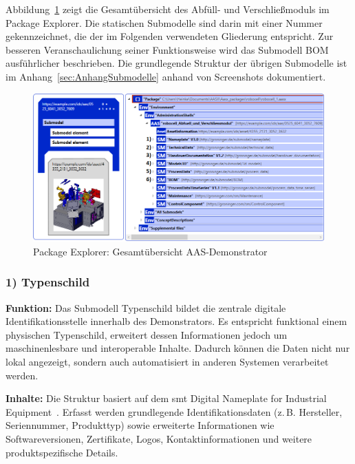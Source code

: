 Abbildung~\ref{fig:PackageExplorerRobocell} zeigt die Gesamtübersicht des Abfüll- und Verschließmoduls im Package Explorer.
Die statischen Submodelle sind darin mit einer Nummer gekennzeichnet, die der im Folgenden verwendeten Gliederung entspricht.
Zur besseren Veranschaulichung seiner Funktionsweise wird das Submodell BOM ausführlicher beschrieben.
Die grundlegende Struktur der übrigen Submodelle ist im Anhang~\ref{sec:AnhangSubmodelle} anhand von Screenshots dokumentiert.

\begin{figure}[htbp]
    \centering
        \includegraphics[width=1\textwidth]{Bilder/ErgebnissePackageExplorer/AASrobocell.PNG}
    \caption{Package Explorer: Gesamtübersicht AAS-Demonstrator}
    \label{fig:PackageExplorerRobocell}
\end{figure}

\subsubsection*{1) Typenschild}
\vspace{-0.5em}
\textbf{Funktion:}  
Das Submodell Typenschild bildet die zentrale digitale Identifikationsstelle innerhalb des Demonstrators. 
Es entspricht funktional einem physischen Typenschild, erweitert dessen Informationen jedoch um maschinenlesbare und interoperable Inhalte. 
Dadurch können die Daten nicht nur lokal angezeigt, sondern auch automatisiert in anderen Systemen verarbeitet werden.

\textbf{Inhalte:}  
Die Struktur basiert auf dem \acs{smt} Digital Nameplate for Industrial Equipment~\cite{SpezifikationTypenschild}.  
Erfasst werden grundlegende Identifikationsdaten (z.\,B. Hersteller, Seriennummer, Produkttyp) sowie erweiterte Informationen wie Softwareversionen, Zertifikate, Logos, Kontaktinformationen und weitere produktspezifische Details.

